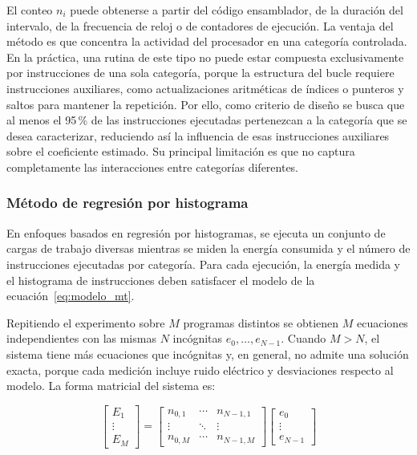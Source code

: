 El conteo $n_i$ puede obtenerse a partir del código ensamblador, de la duración
del intervalo, de la frecuencia de reloj o de contadores de ejecución. La ventaja
del método es que concentra la actividad del procesador en una categoría
controlada. En la práctica, una rutina de este tipo no puede estar compuesta
exclusivamente por instrucciones de una sola categoría, porque la estructura del
bucle requiere instrucciones auxiliares, como actualizaciones aritméticas de
índices o punteros y saltos para mantener la repetición. Por ello, como criterio
de diseño se busca que al menos el 95\,\% de las instrucciones ejecutadas
pertenezcan a la categoría que se desea caracterizar, reduciendo así la
influencia de esas instrucciones auxiliares sobre el coeficiente estimado. Su
principal limitación es que no captura completamente las interacciones entre
categorías diferentes.

\subsubsection*{Método de regresión por histograma}

En enfoques basados en regresión por histogramas, se ejecuta un conjunto de
cargas de trabajo diversas mientras se miden la energía consumida y el número de
instrucciones ejecutadas por categoría. Para cada ejecución, la energía medida y
el histograma de instrucciones deben satisfacer el modelo de la
ecuación~\ref{eq:modelo_mt}.

Repitiendo el experimento sobre $M$ programas distintos se obtienen $M$
ecuaciones independientes con las mismas $N$ incógnitas $e_0, \ldots, e_{N-1}$.
Cuando $M > N$, el sistema tiene más ecuaciones que incógnitas y, en general, no
admite una solución exacta, porque cada medición incluye ruido eléctrico y
desviaciones respecto al modelo. La forma matricial del sistema es:

\begin{equation}
    \begin{bmatrix} E_1 \\ \vdots \\ E_M \end{bmatrix}
    =
    \begin{bmatrix} n_{0,1} & \cdots & n_{N-1,1} \\ \vdots & \ddots & \vdots \\
    n_{0,M} & \cdots & n_{N-1,M} \end{bmatrix}
    \begin{bmatrix} e_0 \\ \vdots \\ e_{N-1} \end{bmatrix}
    \label{eq:regresion}
\end{equation}

